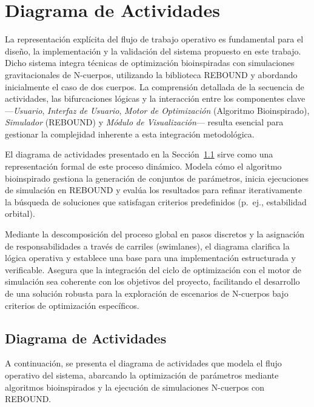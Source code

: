 \section{Diagrama de Actividades}%
\label{sec:diagrama_actividades} %

La representación explícita del flujo de trabajo operativo es fundamental para el diseño, la implementación y la validación del sistema propuesto en este trabajo. Dicho sistema integra técnicas de optimización bioinspiradas con simulaciones gravitacionales de N-cuerpos, utilizando la biblioteca REBOUND y abordando inicialmente el caso de dos cuerpos. La comprensión detallada de la secuencia de actividades, las bifurcaciones lógicas y la interacción entre los componentes clave —\textit{Usuario}, \textit{Interfaz de Usuario}, \textit{Motor de Optimización} (Algoritmo Bioinspirado), \textit{Simulador} (REBOUND) y \textit{Módulo de Visualización}— resulta esencial para gestionar la complejidad inherente a esta integración metodológica.

El diagrama de actividades presentado en la Sección~\ref{subsec:activity_diagram_img} sirve como una representación formal de este proceso dinámico. Modela cómo el algoritmo bioinspirado gestiona la generación de conjuntos de parámetros, inicia ejecuciones de simulación en REBOUND y evalúa los resultados para refinar iterativamente la búsqueda de soluciones que satisfagan criterios predefinidos (p.\ ej., estabilidad orbital).

Mediante la descomposición del proceso global en pasos discretos y la asignación de responsabilidades a través de carriles (swimlanes), el diagrama clarifica la lógica operativa y establece una base para una implementación estructurada y verificable. Asegura que la integración del ciclo de optimización con el motor de simulación sea coherente con los objetivos del proyecto, facilitando el desarrollo de una solución robusta para la exploración de escenarios de N-cuerpos bajo criterios de optimización específicos.
\newpage
\subsection{Diagrama de Actividades}%
\label{subsec:activity_diagram_img}

A continuación, se presenta el diagrama de actividades que modela el flujo operativo del sistema, abarcando la optimización de parámetros mediante algoritmos bioinspirados y la ejecución de simulaciones N-cuerpos con REBOUND.\

